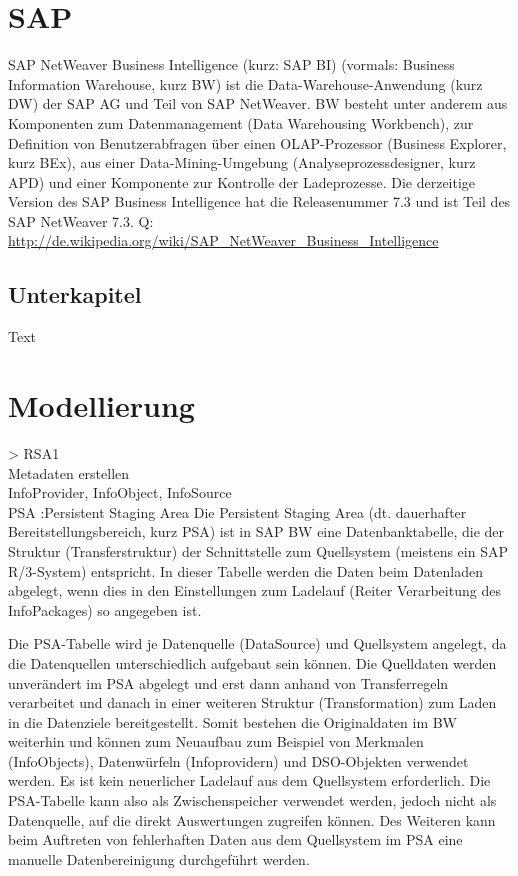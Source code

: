 \chapter{SAP}
\label{Kapitel:Einleitung}

SAP NetWeaver Business Intelligence (kurz: SAP BI) (vormals: Business Information Warehouse, kurz BW) ist die Data-Warehouse-Anwendung (kurz DW) der SAP AG und Teil von SAP NetWeaver. BW besteht unter anderem aus Komponenten zum Datenmanagement (Data Warehousing Workbench), zur Definition von Benutzerabfragen über einen OLAP-Prozessor (Business Explorer, kurz BEx), aus einer Data-Mining-Umgebung (Analyseprozessdesigner, kurz APD) und einer Komponente zur Kontrolle der Ladeprozesse. Die derzeitige Version des SAP Business Intelligence hat die Releasenummer 7.3 und ist Teil des SAP NetWeaver 7.3. 
Q: \url{http://de.wikipedia.org/wiki/SAP_NetWeaver_Business_Intelligence}


\section{Unterkapitel}
\label{Abschnitt:Motivation}


Text

\chapter{Modellierung}
> RSA1\\
Metadaten erstellen\\
InfoProvider, InfoObject, InfoSource\\
PSA :Persistent Staging Area
Die Persistent Staging Area (dt. dauerhafter Bereitstellungsbereich, kurz PSA) ist in SAP BW eine Datenbanktabelle, die der Struktur (Transferstruktur) der Schnittstelle zum Quellsystem (meistens ein SAP R/3-System) entspricht. In dieser Tabelle werden die Daten beim Datenladen abgelegt, wenn dies in den Einstellungen zum Ladelauf (Reiter Verarbeitung des InfoPackages) so angegeben ist.

Die PSA-Tabelle wird je Datenquelle (DataSource) und Quellsystem angelegt, da die Datenquellen unterschiedlich aufgebaut sein können. Die Quelldaten werden unverändert im PSA abgelegt und erst dann anhand von Transferregeln verarbeitet und danach in einer weiteren Struktur (Transformation) zum Laden in die Datenziele bereitgestellt. Somit bestehen die Originaldaten im BW weiterhin und können zum Neuaufbau zum Beispiel von Merkmalen (InfoObjects), Datenwürfeln (Infoprovidern) und DSO-Objekten verwendet werden. Es ist kein neuerlicher Ladelauf aus dem Quellsystem erforderlich. Die PSA-Tabelle kann also als Zwischenspeicher verwendet werden, jedoch nicht als Datenquelle, auf die direkt Auswertungen zugreifen können. Des Weiteren kann beim Auftreten von fehlerhaften Daten aus dem Quellsystem im PSA eine manuelle Datenbereinigung durchgeführt werden.

